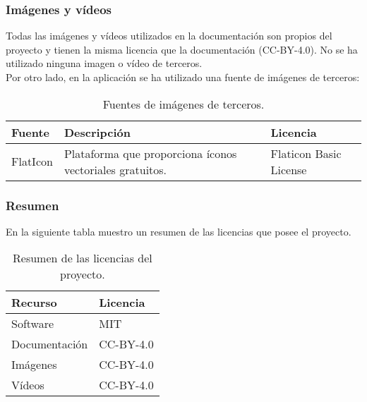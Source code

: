 \subsubsection{Imágenes y vídeos}
Todas las imágenes y vídeos utilizados en la documentación son propios del proyecto y tienen la misma licencia que la documentación (CC-BY-4.0). No se ha utilizado ninguna imagen o vídeo de terceros. \\
Por otro lado, en la aplicación se ha utilizado una fuente de imágenes de terceros:
\begin{table}[h!]
\centering
\begin{tabular}{>{\raggedright}m{4cm} >{\raggedright}m{6cm} >{\raggedright\arraybackslash}m{2cm}}
\toprule
\textbf{Fuente} & \textbf{Descripción} & \textbf{Licencia} \\
\midrule
FlatIcon & Plataforma que proporciona íconos vectoriales gratuitos. & Flaticon Basic License \\
\bottomrule
\end{tabular}
\caption{Fuentes de imágenes de terceros.}
\label{table:third_party_icons}
\end{table}

\subsubsection{Resumen}
En la siguiente tabla muestro un resumen de las licencias que posee el proyecto.
\begin{table}[H]
\centering
\begin{tabular}{>{\raggedright}m{6cm} >{\raggedright\arraybackslash}m{3cm}}
\toprule
\textbf{Recurso} & \textbf{Licencia} \\
\midrule
Software & MIT \\
Documentación & CC-BY-4.0 \\
Imágenes & CC-BY-4.0 \\
Vídeos & CC-BY-4.0 \\
\bottomrule
\end{tabular}
\caption{Resumen de las licencias del proyecto.}
\label{table:project_licenses}
\end{table}

